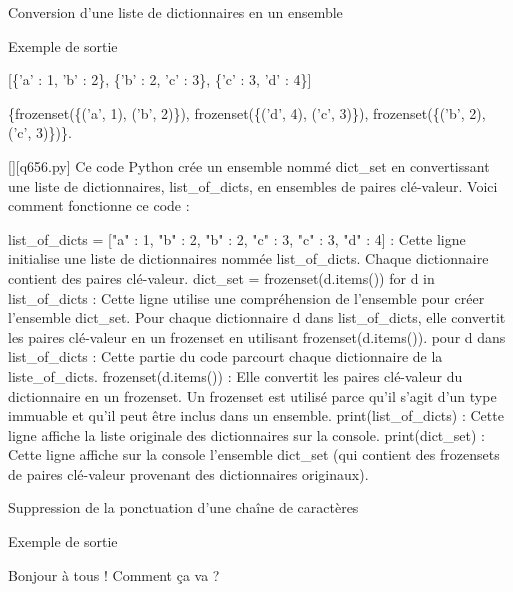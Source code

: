         \question
        Conversion d'une liste de dictionnaires en un ensemble

Exemple de sortie

[\{'a' : 1, 'b' : 2\}, \{'b' : 2, 'c' : 3\}, \{'c' : 3, 'd' : 4\}]

\{frozenset(\{('a', 1), ('b', 2)\}), frozenset(\{('d', 4), ('c', 3)\}), frozenset(\{('b', 2), ('c', 3)\})\}.
        \par
        \begin{solution}
            \renewcommand{\nomfichier}{q656.py}
            \pythonfile{\chemincode \nomfichier}[][\nomfichier]
            Ce code Python crée un ensemble nommé dict_set en convertissant une liste de dictionnaires, list_of_dicts, en ensembles de paires clé-valeur. Voici comment fonctionne ce code :

    list_of_dicts = [{"a" : 1, "b" : 2}, {"b" : 2, "c" : 3}, {"c" : 3, "d" : 4}] : Cette ligne initialise une liste de dictionnaires nommée list_of_dicts. Chaque dictionnaire contient des paires clé-valeur.
    dict_set = {frozenset(d.items()) for d in list_of_dicts} : Cette ligne utilise une compréhension de l'ensemble pour créer l'ensemble dict_set. Pour chaque dictionnaire d dans list_of_dicts, elle convertit les paires clé-valeur en un frozenset en utilisant frozenset(d.items()).
        pour d dans list_of_dicts : Cette partie du code parcourt chaque dictionnaire de la liste_of_dicts.
        frozenset(d.items()) : Elle convertit les paires clé-valeur du dictionnaire en un frozenset. Un frozenset est utilisé parce qu'il s'agit d'un type immuable et qu'il peut être inclus dans un ensemble.
    print(list_of_dicts) : Cette ligne affiche la liste originale des dictionnaires sur la console.
    print(dict_set) : Cette ligne affiche sur la console l'ensemble dict_set (qui contient des frozensets de paires clé-valeur provenant des dictionnaires originaux).
        \end{solution}
        

        \question
        Suppression de la ponctuation d'une chaîne de caractères

Exemple de sortie

Bonjour à tous ! Comment ça va ?

